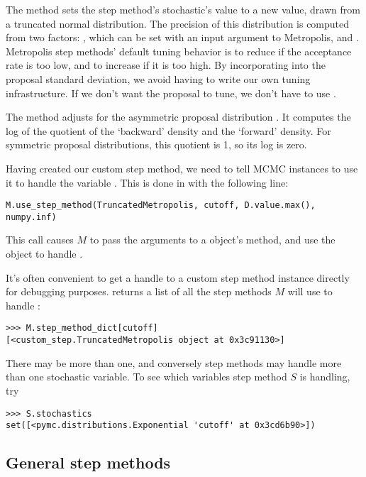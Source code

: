 The  method sets the step method's stochastic's value to a new value, drawn from a truncated normal distribution. The precision of this distribution is computed from two factors: , which can be set with an input argument to Metropolis, and . Metropolis step methods' default tuning behavior is to reduce  if the acceptance rate is too low, and to increase  if it is too high. By incorporating  into the proposal standard deviation, we avoid having to write our own tuning infrastructure. If we don't want the proposal to tune, we don't have to use .

The  method adjusts for the asymmetric proposal distribution \citep{gelman}. It computes the log of the quotient of the `backward' density and the `forward' density. For symmetric proposal distributions, this quotient is 1, so its log is zero. 

\medskip
Having created our custom step method, we need to tell MCMC instances to use it to handle the variable . This is done in  with the following line:
\begin{verbatim}
M.use_step_method(TruncatedMetropolis, cutoff, D.value.max(), numpy.inf)
\end{verbatim}
This call causes $M$ to pass the arguments  to a  object's  method, and use the object to handle .

\medskip
It's often convenient to get a handle to a custom step method instance directly for debugging purposes.  returns a list of all the step methods $M$ will use to handle :
\begin{verbatim}
>>> M.step_method_dict[cutoff]
[<custom_step.TruncatedMetropolis object at 0x3c91130>]
\end{verbatim}
There may be more than one, and conversely step methods may handle more than one stochastic variable. To see which variables step method $S$ is handling, try
\begin{verbatim}
>>> S.stochastics
set([<pymc.distributions.Exponential 'cutoff' at 0x3cd6b90>])
\end{verbatim}


\subsection{General step methods} \label{user-gen}


